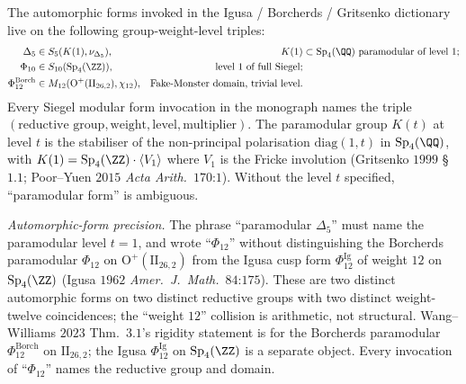 \begin{theorem}
\label{wn:thm:third-pass-siegel-weight-level}

The automorphic forms invoked in the Igusa / Borcherds / Gritsenko
dictionary live on the following group-weight-level triples:
\begin{align*}
\Delta_5 &\in S_5(K(1), \nu_{\Delta_5}),
& K(1) &\subset \mathrm{Sp}_4(\QQ)\text{ paramodular of level }1; \\
\Phi_{10} &\in S_{10}(\mathrm{Sp}_4(\ZZ)),
& \text{level }1\text{ of full Siegel}; \\
\Phi_{12}^{\mathrm{Borch}} &\in M_{12}(\mathrm{O}^+(\mathrm{II}_{26, 2}),
\chi_{12}),
& \text{Fake-Monster domain, trivial level}.
\end{align*}
Every Siegel modular form invocation in the monograph names the
triple $(\text{reductive group}, \text{weight}, \text{level},
\text{multiplier})$. The paramodular group $K(t)$ at level $t$
is the stabiliser of the non-principal polarisation
$\mathrm{diag}(1, t)$ in $\mathrm{Sp}_4(\QQ)$, with $K(1) =
\mathrm{Sp}_4(\ZZ)\cdot \langle V_1 \rangle$ where $V_1$ is the
Fricke involution (Gritsenko $1999$ \S$1.1$; Poor--Yuen $2015$
\emph{Acta Arith.}~$170$:$1$). Without the level $t$ specified,
``paramodular form'' is ambiguous.

\emph{Automorphic-form precision.} The phrase
``paramodular $\Delta_5$'' must name the paramodular level
$t = 1$, and wrote ``$\Phi_{12}$'' without distinguishing the
Borcherds paramodular $\Phi_{12}$ on $\mathrm{O}^+(\mathrm{II}_{26,
2})$ from the Igusa cusp form $\Phi_{12}^{\mathrm{Ig}}$ of weight $12$
on $\mathrm{Sp}_4(\ZZ)$ (Igusa $1962$
\emph{Amer.~J.~Math.}~$84$:$175$). These are two distinct
automorphic forms on two distinct reductive groups with two distinct
weight-twelve coincidences; the ``weight $12$'' collision is
arithmetic, not structural.  Wang--Williams $2023$
Thm.~$3.1$'s rigidity statement is for the Borcherds paramodular
$\Phi_{12}^{\mathrm{Borch}}$ on $\mathrm{II}_{26, 2}$; the Igusa
$\Phi_{12}^{\mathrm{Ig}}$ on $\mathrm{Sp}_4(\ZZ)$ is a separate
object. Every invocation of ``$\Phi_{12}$'' names the reductive
group and domain.
\end{theorem}

